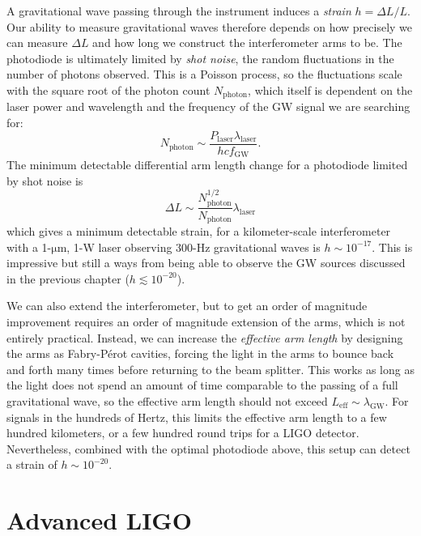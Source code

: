 A gravitational wave passing through the instrument induces a \textit{strain} $h = \Delta L / L$.
Our ability to measure gravitational waves therefore depends on how precisely we can measure $\Delta L$ and how long we construct the interferometer arms to be.
The photodiode is ultimately limited by \textit{shot noise}, the random fluctuations in the number of photons observed.
This is a Poisson process, so the fluctuations scale with the square root of the photon count $N_{\mathrm{photon}}$, which itself is dependent on the laser power and wavelength and the frequency of the GW signal we are searching for:
\begin{equation}
  N_{\mathrm{photon}} \sim \frac{P_{\mathrm{laser}} \lambda_{\mathrm{laser}}}{h c f_{\mathrm{GW}}}.
\end{equation}
The minimum detectable differential arm length change for a photodiode limited by shot noise is
\begin{equation}
  \Delta L \sim \frac{N_{\mathrm{photon}}^{1/2}}{N_{\mathrm{photon}}} \lambda_{\mathrm{laser}}
\end{equation}
which gives a minimum detectable strain, for a kilometer-scale interferometer with a 1-$\mathrm{\mu}$m, 1-W laser observing 300-Hz gravitational waves is $h \sim 10^{-17}$.
This is impressive but still a ways from being able to observe the GW sources discussed in the previous chapter ($h \lesssim 10^{-20}$).

We can also extend the interferometer, but to get an order of magnitude improvement requires an order of magnitude extension of the arms, which is not entirely practical.
Instead, we can increase the \textit{effective arm length} by designing the arms as Fabry-P\'erot cavities, forcing the light in the arms to bounce back and forth many times before returning to the beam splitter.
This works as long as the light does not spend an amount of time comparable to the passing of a full gravitational wave, so the effective arm length should not exceed $L_{\mathrm{eff}} \sim \lambda_{\mathrm{GW}}$.
For signals in the hundreds of Hertz, this limits the effective arm length to a few hundred kilometers, or a few hundred round trips for a LIGO detector.
Nevertheless, combined with the optimal photodiode above, this setup can detect a strain of $h \sim 10^{-20}$.


\section{Advanced LIGO}

